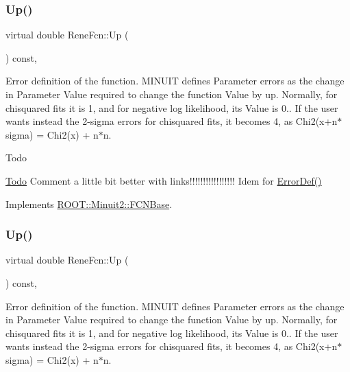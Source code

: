 \subsubsection{\texorpdfstring{Up()}{Up()}\hspace{0.1cm}{\footnotesize\ttfamily [1/2]}}
{\footnotesize\ttfamily virtual double Rene\+Fcn\+::\+Up (\begin{DoxyParamCaption}{ }\end{DoxyParamCaption}) const\hspace{0.3cm}{\ttfamily [inline]}, {\ttfamily [virtual]}}

Error definition of the function. M\+I\+N\+U\+IT defines Parameter errors as the change in Parameter Value required to change the function Value by up. Normally, for chisquared fits it is 1, and for negative log likelihood, its Value is 0.. If the user wants instead the 2-\/sigma errors for chisquared fits, it becomes 4, as Chi2(x+n$\ast$sigma) = Chi2(x) + n$\ast$n.

\begin{DoxyRefDesc}{Todo}
\item[\mbox{\hyperlink{todo__todo000001}{Todo}}]Comment a little bit better with links!!!!!!!!!!!!!!!!! Idem for \mbox{\hyperlink{classROOT_1_1Minuit2_1_1FCNBase_ac4592475c58a65b037ba97ab5f3cba10}{Error\+Def()}}\end{DoxyRefDesc}


Implements \mbox{\hyperlink{classROOT_1_1Minuit2_1_1FCNBase_a04ef08ddad92ce8d89d498efbe021c39}{R\+O\+O\+T\+::\+Minuit2\+::\+F\+C\+N\+Base}}.

\mbox{\label{classReneFcn_a5e7e439a47c37d673d9366918c74239c}} 
\subsubsection{\texorpdfstring{Up()}{Up()}\hspace{0.1cm}{\footnotesize\ttfamily [2/2]}}
{\footnotesize\ttfamily virtual double Rene\+Fcn\+::\+Up (\begin{DoxyParamCaption}{ }\end{DoxyParamCaption}) const\hspace{0.3cm}{\ttfamily [inline]}, {\ttfamily [virtual]}}

Error definition of the function. M\+I\+N\+U\+IT defines Parameter errors as the change in Parameter Value required to change the function Value by up. Normally, for chisquared fits it is 1, and for negative log likelihood, its Value is 0.. If the user wants instead the 2-\/sigma errors for chisquared fits, it becomes 4, as Chi2(x+n$\ast$sigma) = Chi2(x) + n$\ast$n.

